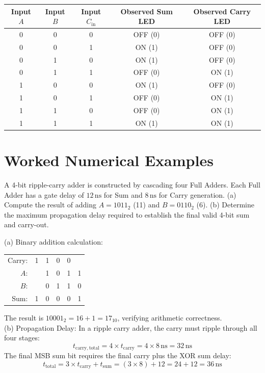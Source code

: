 \begin{observationtable}
\begin{center}
\begin{tabular}{ccccc}
\toprule
\textbf{Input $A$} & \textbf{Input $B$} & \textbf{Input $C_{\mathrm{in}}$} & \textbf{Observed Sum LED} & \textbf{Observed Carry LED} \\
\midrule
0 & 0 & 0 & OFF (0) & OFF (0) \\
0 & 0 & 1 & ON (1) & OFF (0) \\
0 & 1 & 0 & ON (1) & OFF (0) \\
0 & 1 & 1 & OFF (0) & ON (1) \\
1 & 0 & 0 & ON (1) & OFF (0) \\
1 & 0 & 1 & OFF (0) & ON (1) \\
1 & 1 & 0 & OFF (0) & ON (1) \\
1 & 1 & 1 & ON (1) & ON (1) \\
\bottomrule
\end{tabular}
\end{center}
\end{observationtable}

\section{Worked Numerical Examples}
\begin{example}
A 4-bit ripple-carry adder is constructed by cascading four Full Adders. Each Full Adder has a gate delay of $12\,\mathrm{ns}$ for Sum and $8\,\mathrm{ns}$ for Carry generation. (a) Compute the result of adding $A = 1011_2$ (11) and $B = 0110_2$ (6). (b) Determine the maximum propagation delay required to establish the final valid 4-bit sum and carry-out.
\end{example}
\begin{solutionbox}
(a) Binary addition calculation:
\begin{center}
\begin{tabular}{rccccc}
Carry: & 1 & 1 & 0 & 0 & \\
$A$: & & 1 & 0 & 1 & 1 \\
$B$: & & 0 & 1 & 1 & 0 \\
\midrule
Sum: & 1 & 0 & 0 & 0 & 1 \\
\end{tabular}
\end{center}
The result is $10001_2 = 16 + 1 = 17_{10}$, verifying arithmetic correctness.\\
(b) Propagation Delay:
In a ripple carry adder, the carry must ripple through all four stages:
\[ t_{\mathrm{carry,total}} = 4 \times t_{\mathrm{carry}} = 4 \times 8\,\mathrm{ns} = 32\,\mathrm{ns} \]
The final MSB sum bit requires the final carry plus the XOR sum delay:
\[ t_{\mathrm{total}} = 3 \times t_{\mathrm{carry}} + t_{\mathrm{sum}} = (3 \times 8) + 12 = 24 + 12 = 36\,\mathrm{ns} \]
\end{solutionbox}

